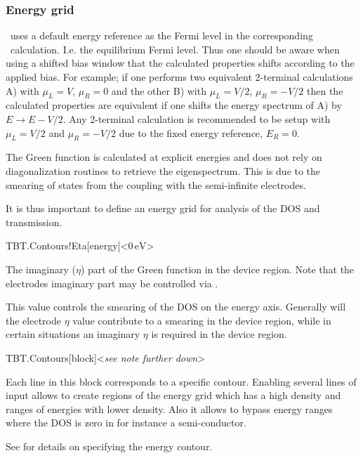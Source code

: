 \subsubsection{Energy grid}

\tbtrans\ uses a default energy reference as the Fermi level in the
corresponding \tsiesta\ calculation. I.e. the equilibrium Fermi
level. Thus one should be aware when using a shifted bias window that
the calculated properties shifts according to the applied bias. For
example; if one performs two equivalent 2-terminal calculations A)
with $\mu_L=V$, $\mu_R=0$ and the other B) with $\mu_L=V/2$,
$\mu_R=-V/2$ then the calculated properties are equivalent if one
shifts the energy spectrum of A) by $E \to E - V/2$. Any 2-terminal
calculation is recommended to be setup with $\mu_L=V/2$ and
$\mu_R=-V/2$ due to the fixed energy reference, $E_R = 0$.

The Green function is calculated at explicit energies and does not
rely on diagonalization routines to retrieve the eigenspectrum. This
is due to the smearing of states from the coupling with the
semi-infinite electrodes.

It is thus important to define an energy grid for analysis of the DOS
and transmission.

\begin{fdfentry}{TBT.Contours!Eta}[energy]<$0\,\mathrm{eV}$>
  
  The imaginary ($\eta$) part of the Green function in the device
  region. Note that the electrodes imaginary part may be controlled
  via .

  This value controls the smearing of the DOS on the energy
  axis. Generally will the electrode $\eta$ value contribute to a
  smearing in the device region, while in certain situations an
  imaginary $\eta$ is required in the device region. 
  
\end{fdfentry}

\begin{fdfentry}{TBT.Contours}[block]<\emph{see note further down}>

  Each line in this block corresponds to a specific contour.
  Enabling several lines of input allows to create regions of the
  energy grid which has a high density and ranges of energies with
  lower density. Also it allows to bypass energy ranges where the DOS
  is zero in for instance a semi-conductor.  

  See  for details on specifying the energy contour.
  
\end{fdfentry}

